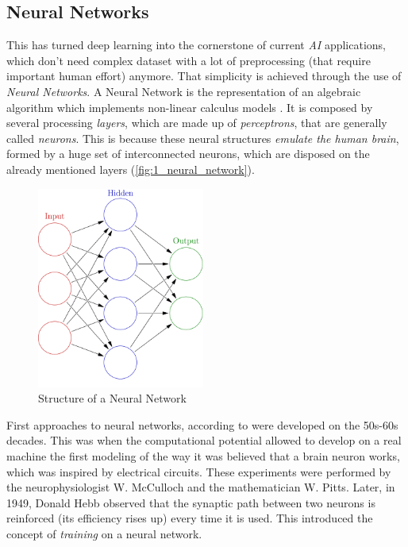\subsection{Neural Networks}
This has turned deep learning into the cornerstone of current \emph{AI} applications, which don't need complex dataset with a lot of preprocessing (that require important human effort) anymore. That simplicity is achieved through the use of \emph{Neural Networks}. A Neural Network is the representation of an algebraic algorithm which implements non-linear calculus models \cite{dl-nature}. It is composed by several processing \textit{layers}, which are made up of \emph{perceptrons}, that are generally called \textit{neurons}. This is because these neural structures \textit{emulate the human brain}, formed by a huge set of interconnected neurons, which are disposed on the already mentioned layers (\autoref{fig:1_neural_network}).\\

\begin{figure}[htpb]
	\centering
	\includegraphics[width=5.5cm]{images/neural_network}
	\caption{Structure of a Neural Network}
	\label{fig:1_neural_network}
\end{figure}

First approaches to neural networks, according to \cite{nn-history} were developed on the 50s-60s decades. This was when the computational potential allowed to develop on a real machine the first modeling of the way it was believed that a brain neuron works, which was inspired by electrical circuits. These experiments \cite{first-neuron} were performed by the neurophysiologist W. McCulloch and the mathematician W. Pitts. Later, in 1949, Donald Hebb \cite{hebb} observed that the synaptic path between two neurons is reinforced (its efficiency rises up) every time it is used. This introduced the concept of \textit{training} on a neural network.


